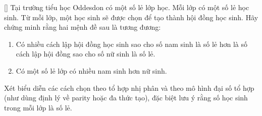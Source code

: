 \documentclass[../09-contruction-methods.tex]{subfiles}
\begin{document}
\begin{exercise*}\label{example:GBR-2015-MO-P2}[\textbf{}]
	Tại trường tiểu học Oddesdon có một số lẻ lớp học. Mỗi lớp có một số lẻ học sinh. Từ mỗi lớp, một học sinh sẽ được chọn để tạo thành hội đồng học sinh.
	Hãy chứng minh rằng hai mệnh đề sau là tương đương:
    \begin{enumerate}[topsep=0pt, partopsep=0pt, itemsep=0pt]
        \item Có nhiều cách lập hội đồng học sinh sao cho số nam sinh là số lẻ hơn là số cách lập hội đồng sao cho số nữ sinh là số lẻ.
        \item Có một số lẻ lớp có nhiều nam sinh hơn nữ sinh.
    \end{enumerate}
\end{exercise*}

\begin{remark*}
	Xét biểu diễn các cách chọn theo tổ hợp nhị phân và theo mô hình đại số tổ hợp (như dùng định lý về parity hoặc đa thức tạo),
    đặc biệt lưu ý rằng số học sinh trong mỗi lớp là số lẻ.
\end{remark*}

\end{document}

